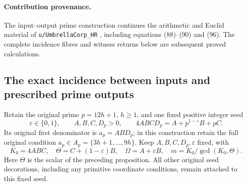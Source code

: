 \paragraph{Contribution provenance.} The input--output prime construction continues the arithmetic and Euclid material of \texttt{u/UmbrellaCorp\_HR} \cite{UmbrellaContribution}, including equations (88)--(90) and (96). The complete incidence fibres and witness returns below are subsequent proved calculations.

\subsection{The exact incidence between inputs and prescribed prime outputs}

Retain the original prime \(p=12h+1\), \(h\ge1\), and one fixed
positive integer seed
\[
 \varepsilon\in\{0,1\},\qquad A,B,C,D_p>0,\qquad
 4ABCD_p=A+p^{1-\varepsilon}B+pC.
\]
Its original first denominator is \(a_p=ABD_p\); in this
construction retain the full original condition
\(a_p\in A_p=\{3h+1,\ldots,9h\}\).
Keep \(A,B,C,D_p,\varepsilon\) fixed, with
\[
 K_0=4ABC,\quad \Theta=C+(1-\varepsilon)B,\quad
 \Omega=A+\varepsilon B,\quad
 m=K_0/\gcd(K_0,\Theta).
\]
Here \(\Theta\) is the scalar of the preceding proposition.
All other original seed decorations, including any primitive
coordinate conditions, remain attached to this fixed seed.

